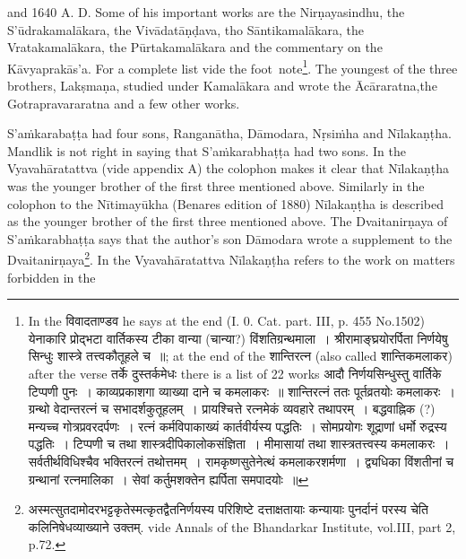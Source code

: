 \documentclass[11pt, openany]{book}
\begin{document}
\noindent
and 1640 A. D. Some of his important works are the Nirṇayasindhu, the S'ūdrakamalākara, the Vivādatāṇḍava, tho Sāntikamalākara, the Vratakamalākara, the Pūrtakamalākara and the commentary on the Kāvyaprakās'a. For a complete list vide the foot\textendash\ note\renewcommand{\thefootnote}{1}\footnote{In the विवादताण्डव he says at the end (I. 0. Cat. part. III, p. 455 No.1502) {\qt येनाकारि प्रोद्भटा वार्तिकस्य टीका वान्या (चान्या?) विंशतिग्रन्थमाला~। श्रीरामाङ्घ्रयोरर्पिता निर्णयेषु सिन्धुः शास्त्रे तत्त्वकौतूहले च~॥}; at the end of the शान्तिरत्न (also called शान्तिकमलाकर) after the verse तर्के दुस्तर्कमेधः there is a list of 22 works आदौ निर्णयसिन्धुस्तु वार्तिके टिप्पणी पुनः~। काव्यप्रकाशगा व्याख्या दाने च कमलाकरः~॥ शान्तिरत्नं ततः पूर्तव्रतयोः कमलाकरः~। ग्रन्थो वेदान्तरत्नं च सभादर्शकुतूहलम्~। प्रायश्चित्ते रत्नमेकं व्यवहारे तथापरम्~। बद्धवाह्निक (?) मन्यच्च गोत्रप्रवरदर्पणः~। रत्नं कर्मविपाकाख्यं कार्तवीर्यस्य पद्धतिः~। सोमप्रयोगः शूद्राणां धर्मो रुद्रस्य पद्धतिः~। टिप्पणी च तथा शास्त्रदीपिकालोकसंज्ञिता~। मीमासायां तथा शास्त्रतत्त्वस्य कमलाकरः~। सर्वतीर्थविधिश्चैव भक्तिरत्नं तथोत्तमम्~। रामकृष्णसुतेनेत्थं कमलाकरशर्मणा~। द्व्यधिका विंशतीनां च ग्रन्थानां रत्नमालिका~। सेवां कर्तुमशक्तेन ह्यर्पिता समपादयोः~॥}. The youngest of the three brothers, Lakṣmaṇa, studied under Kamalākara and wrote the Ācāraratna,the Gotrapravararatna and a few other works.

S'aṁkarabaṭṭa had four sons, Ranganātha, Dāmodara, Nṛsiṁha and Nīlakaṇṭha. Mandlik is not right in saying that S'aṁkarabhaṭṭa had two sons. In the Vyavahāratattva (vide appendix A) the colophon makes it clear that Nīlakaṇṭha was the younger brother of the first three mentioned above. Similarly in the colophon to the Nītimayūkha (Benares edition of 1880) Nīlakaṇṭha is described as the younger brother of the first three mentioned above. The Dvaitanirṇaya of S'aṁkarabhaṭṭa says that the author's son Dāmodara wrote a supplement to the Dvaitanirṇaya\renewcommand{\thefootnote}{2}\footnote{अस्मत्सुतदामोदरभट्टकृतेस्मत्कृतद्वैतनिर्णयस्य परिशिष्टे दत्ताक्षतायाः कन्यायाः पुनर्दानं परस्य चेति कलिनिषेधव्याख्याने उक्तम्. vide Annals of the Bhandarkar Institute, vol.III, part 2, p.72.}. In the Vyavahāratattva Nīlakaṇṭha refers to the work on matters forbidden in the

\newpage
\end{document}
